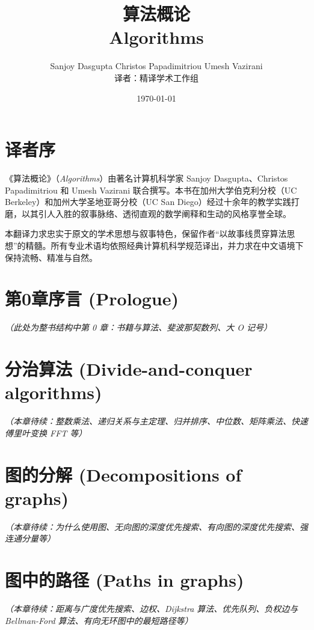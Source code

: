 \documentclass[11pt,a4paper,openany]{book}
\title{\Huge\textbf{算\quad 法\quad 概\quad 论}\\[1.5ex] \Large \textsf{Algorithms}}
\author{\Large Sanjoy Dasgupta \quad Christos Papadimitriou \quad Umesh Vazirani \\[2ex] \normalsize 译者：精译学术工作组}
\date{\today}
\theoremstyle{definition}
\begin{document}
\frontmatter
\maketitle

\chapter*{译者序}
《算法概论》（\textit{Algorithms}）由著名计算机科学家 Sanjoy Dasgupta、Christos Papadimitriou 和 Umesh Vazirani 联合撰写。本书在加州大学伯克利分校（UC Berkeley）和加州大学圣地亚哥分校（UC San Diego）经过十余年的教学实践打磨，以其引人入胜的叙事脉络、透彻直观的数学阐释和生动的风格享誉全球。

本翻译力求忠实于原文的学术思想与叙事特色，保留作者“以故事线贯穿算法思想”的精髓。所有专业术语均依照经典计算机科学规范译出，并力求在中文语境下保持流畅、精准与自然。

\tableofcontents

\mainmatter

\chapter*{第0章\quad 序言 (Prologue)}
\textit{（此处为整书结构中第 0 章：书籍与算法、斐波那契数列、大 O 记号）}



\chapter{分治算法 (Divide-and-conquer algorithms)}
\textit{（本章待续：整数乘法、递归关系与主定理、归并排序、中位数、矩阵乘法、快速傅里叶变换 FFT 等）}

\chapter{图的分解 (Decompositions of graphs)}
\textit{（本章待续：为什么使用图、无向图的深度优先搜索、有向图的深度优先搜索、强连通分量等）}

\chapter{图中的路径 (Paths in graphs)}
\textit{（本章待续：距离与广度优先搜索、边权、Dijkstra 算法、优先队列、负权边与 Bellman-Ford 算法、有向无环图中的最短路径等）}
\end{document}
